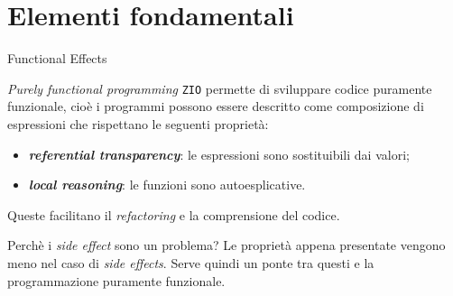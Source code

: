 \section{Elementi fondamentali}

\begin{frame}{Functional Effects}
  \begin{block}{\textit{Purely functional programming}}
    \texttt{ZIO} permette di sviluppare codice puramente funzionale, cioè i programmi possono essere descritto come composizione di espressioni che rispettano le seguenti proprietà: 
    \begin{itemize}
      \item \textbf{\textit{referential transparency}}: le espressioni sono sostituibili dai valori;
      \item \textbf{\textit{local reasoning}}: le funzioni sono autoesplicative.
    \end{itemize}
    Queste facilitano il \textit{refactoring} e la comprensione del codice.
  \end{block}

  \begin{alertblock}{Perchè i \textit{side effect} sono un problema?}
    Le proprietà appena presentate vengono meno nel caso di \textit{side effects}. Serve quindi un ponte tra questi e la programmazione puramente funzionale.
  \end{alertblock}
\end{frame}

